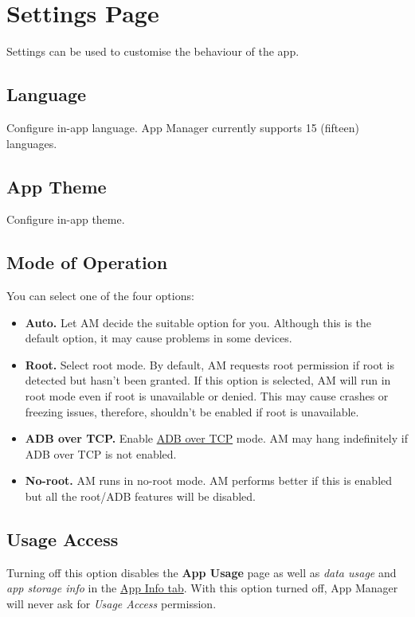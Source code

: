 \section{Settings Page}\label{sec:settings-page}
Settings can be used to customise the behaviour of the app.

\subsection{Language}\label{subsec:language}
Configure in-app language. App Manager currently supports 15 (fifteen) languages.

\subsection{App Theme}\label{subsec:app-theme}
Configure in-app theme.

\subsection{Mode of Operation}\label{subsec:mode-of-operation}
You can select one of the four options:
\begin{itemize}
    \item \textbf{Auto.} Let AM decide the suitable option for you. Although this is the default option, it may cause
    problems in some devices.
    \item \textbf{Root.} Select root mode. By default, AM requests root permission if root is detected but hasn't
    been granted. If this option is selected, AM will run in root mode even if root is unavailable or denied. This may
    cause crashes or freezing issues, therefore, shouldn't be enabled if root is unavailable.
    \item \textbf{ADB over TCP.} Enable \hyperref[sec:adb-over-tcp]{ADB over TCP} mode. AM may hang indefinitely if ADB
    over TCP is not enabled.
    \item \textbf{No-root.} AM runs in no-root mode. AM performs better if this is enabled but all the root/ADB
    features will be disabled.
\end{itemize}

\subsection{Usage Access}\label{subsec:usage-access}
Turning off this option disables the \textbf{App Usage} page as well as \textit{data usage} and \textit{app storage info} in
the \hyperref[subsec:app-info-tab]{App Info tab}. With this option turned off, App Manager will never ask for
\textit{Usage Access} permission.

